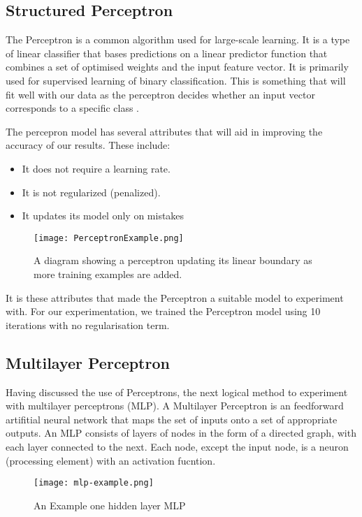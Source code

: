 \documentclass[bsc,frontabs,twoside,singlespacing,parskip,deptreport]{infthesis}     %
\begin{document}
\subsection{Structured Perceptron}
The Perceptron is a common algorithm used for large-scale learning.
It is a type of linear classifier that bases predictions on a linear predictor function that combines a set of optimised weights
and the input feature vector.
It is primarily used for supervised learning of binary classification.
This is something that will fit well with our data as the perceptron decides whether an input vector
corresponds to a specific class \cite{freund1999large}.

The percepron model has several attributes that will aid in improving the accuracy of our results.
These include:
\begin{itemize}
\item It does not require a learning rate.
\item It is not regularized (penalized).
\item It updates its model only on mistakes
\end{itemize}

\begin{figure}[ht]
  \centering
  \texttt{[image: PerceptronExample.png]}
  \caption{A diagram showing a perceptron updating its linear boundary as more training examples are added. }
\end{figure}


It is these attributes that made the Perceptron a suitable model to experiment with.
For our experimentation, we trained the Perceptron model using  10 iterations with no regularisation term.
\subsection{Multilayer Perceptron}
Having discussed the use of Perceptrons, the next logical method to experiment with multilayer perceptrons (MLP).
A Multilayer Perceptron is an feedforward artifitial neural network that maps the set of inputs
onto a set of appropriate outputs.
An MLP consists of layers of  nodes in the form of a directed graph, with each layer connected to the next.
Each node, except the input node, is a neuron (processing element) with an activation fucntion.

\begin{figure}
  \centering
  \texttt{[image: mlp-example.png]}
  \caption{An Example one hidden layer MLP \cite{}}%
  \label{fig:mlp}
\end{figure}
\end{document}
